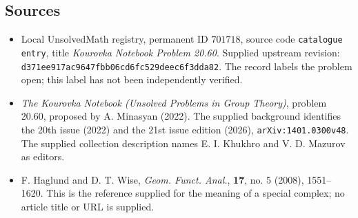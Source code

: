 \documentclass[11pt]{article}
\begin{document}
\subsection{Sources}
\begin{itemize}
\item Local UnsolvedMath registry, permanent ID \(701718\), source code \texttt{catalogue entry}, title \emph{Kourovka Notebook Problem 20.60}. Supplied upstream revision: \texttt{d371ee917ac9647fbb06cd6fc529deec6f3dda82}. The record labels the problem open; this label has not been independently verified.
\item \emph{The Kourovka Notebook (Unsolved Problems in Group Theory)}, problem 20.60, proposed by A. Minasyan (2022). The supplied background identifies the 20th issue (2022) and the 21st issue edition (2026), \texttt{arXiv:1401.0300v48}. The supplied collection description names E. I. Khukhro and V. D. Mazurov as editors.
\item F. Haglund and D. T. Wise, \emph{Geom. Funct. Anal.}, \textbf{17}, no. 5 (2008), 1551--1620. This is the reference supplied for the meaning of a special complex; no article title or URL is supplied.
\end{itemize}
\end{document}
